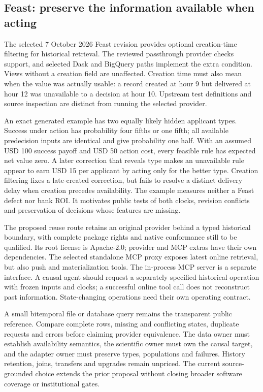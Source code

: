 \hypertarget{feast-preserve-the-information-available-when-acting}{%
\subsection{Feast: preserve the information available when
acting}\label{feast-preserve-the-information-available-when-acting}}

The selected 7 October 2026 Feast revision provides optional
creation-time filtering for historical retrieval. The reviewed
passthrough provider checks support, and selected Dask and BigQuery
paths implement the extra condition. Views without a creation field are
unaffected. Creation time must also mean when the value was actually
usable: a record created at hour 9 but delivered at hour 12 was
unavailable to a decision at hour 10. Upstream test definitions and
source inspection are distinct from running the selected provider.
\citep{exec19_feast_source}

An exact generated example has two equally likely hidden applicant
types. Success under action has probability four fifths or one fifth;
all available predecision inputs are identical and give probability one
half. With an assumed USD 100 success payoff and USD 50 action cost,
every feasible rule has expected net value zero. A later correction that
reveals type makes an unavailable rule appear to earn USD 15 per
applicant by acting only for the better type. Creation filtering fixes a
late-created correction, but fails to resolve a distinct delivery delay
when creation precedes availability. The example measures neither a
Feast defect nor bank ROI. It motivates public tests of both clocks,
revision conflicts and preservation of decisions whose features are
missing. \citep{exec19_feast_reference}

The proposed reuse route retains an original provider behind a typed
historical boundary, with complete package rights and native conformance
still to be qualified. Its root license is Apache-2.0; provider and MCP
extras have their own dependencies. The selected standalone MCP proxy
exposes latest online retrieval, but also push and materialization
tools. The in-process MCP server is a separate interface. A causal agent
should request a separately specified historical operation with frozen
inputs and clocks; a successful online tool call does not reconstruct
past information. State-changing operations need their own operating
contract. \citep{exec19_feast_source}

A small bitemporal file or database query remains the transparent public
reference. Compare complete rows, missing and conflicting states,
duplicate requests and errors before claiming provider equivalence. The
data owner must establish availability semantics, the scientific owner
must own the causal target, and the adapter owner must preserve types,
populations and failures. History retention, joins, transfers and
upgrades remain unpriced. The current source-grounded choice extends the
prior proposal without closing broader software coverage or
institutional gates. \citep{sp19coat_reader,sp19coat_progress}

